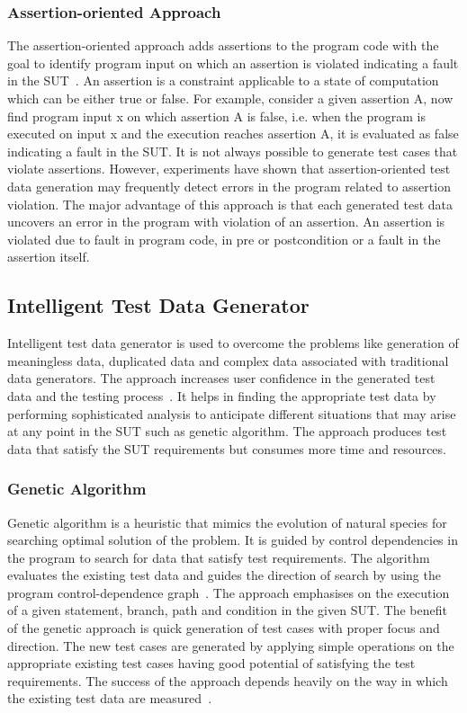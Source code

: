 \subsubsection{Assertion-oriented Approach}
The assertion-oriented approach adds assertions to the program code with the goal to identify program input on which an assertion is violated indicating a fault in the SUT~\cite{korel1996assertion}. An assertion is a constraint applicable to a state of computation which can be either true or false. For example, consider a given assertion A, now find program input x on which assertion A is false, i.e. when the program is executed on input x and the execution reaches assertion A, it is evaluated as false indicating a fault in the SUT. It is not always possible to generate test cases that violate assertions. However, experiments have shown that assertion-oriented test data generation may frequently detect errors in the program related to assertion violation. The major advantage of this approach is that each generated test data uncovers an error in the program with violation of an assertion. An assertion is violated due to fault in program code, in pre or postcondition or a fault in the assertion itself.



\subsection{Intelligent Test Data Generator}
\label{sec:intelligent_2}
Intelligent test data generator is used to overcome the problems like generation of meaningless data, duplicated data and complex data associated with traditional data generators. The approach increases user confidence in the generated test data and the testing process~\cite{ramamoorthy1975testing}. It helps in finding the appropriate test data by performing sophisticated analysis to anticipate different situations that may arise at any point in the SUT such as genetic algorithm. The approach produces test data that satisfy the SUT requirements but consumes more time and resources.

\subsubsection{Genetic Algorithm}
Genetic algorithm is a heuristic that mimics the evolution of natural species for searching optimal solution of the problem. It is guided by control dependencies in the program to search for data that satisfy test requirements. The algorithm evaluates the existing test data and guides the direction of search by using the program control-dependence graph~\cite{pargas1999test}. The approach emphasises on the execution of a given statement, branch, path and condition in the given SUT. The benefit of the genetic approach is quick generation of test cases with proper focus and direction. The new test cases are generated by applying simple operations on the appropriate existing test cases having good potential of satisfying the test requirements. The success of the approach depends heavily on the way in which the existing test data are measured~\cite{pargas1999test}.


